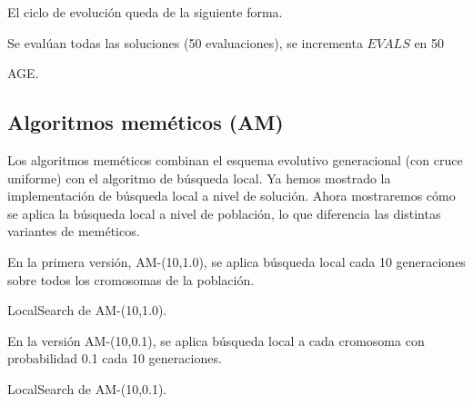 \documentclass{article}
\begin{document}
El ciclo de evolución queda de la siguiente forma.

\begin{algorithm}[H]
	\DontPrintSemicolon %
	Se evalúan todas las soluciones (50 evaluaciones), se incrementa $EVALS$ en 50\;
	\caption{{\sc AGE}.}
	\label{alg:stationary}
\end{algorithm}

\subsection{Algoritmos meméticos (AM)}

Los algoritmos meméticos combinan el esquema evolutivo generacional (con cruce uniforme) con el algoritmo de búsqueda local. Ya hemos mostrado la implementación
de búsqueda local a nivel de solución. Ahora mostraremos cómo se aplica la búsqueda local a nivel de población, lo que diferencia las
distintas variantes de meméticos.

En la primera versión, AM-(10,1.0), se aplica búsqueda local cada 10 generaciones sobre todos los cromosomas de la población.

\begin{algorithm}[H]
	\DontPrintSemicolon %
	\caption{{\sc LocalSearch} de AM-(10,1.0).}
	\label{alg:am-10-1}
\end{algorithm}

En la versión AM-(10,0.1), se aplica búsqueda local a cada cromosoma con probabilidad 0.1 cada 10 generaciones.

\begin{algorithm}[H]
	\DontPrintSemicolon %
	\caption{{\sc LocalSearch} de AM-(10,0.1).}
	\label{alg:am-10-01}
\end{algorithm}
\end{document}

